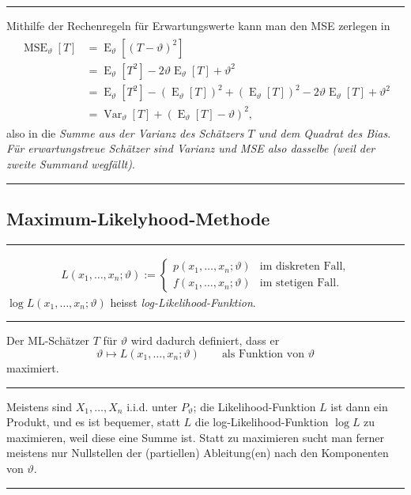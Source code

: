 \documentclass[a4paper, 12pt]{extarticle}
\newcommand{\sep}{\vspace{5pt}\noindent\hrule\vspace{5pt}}
\newcommand{\Var}[2][]{\operatorname{Var}_{#1}\left[ #2 \right]}
\newcommand{\Exp}[2][]{\operatorname{E}_{#1}\left[ #2 \right]}
\newcommand{\MSE}[2][]{\operatorname{MSE}_{#1}\left[ #2 \right]}
\begin{document}
\begin{multicols*}{2}
\sep

\Com Mithilfe der Rechenregeln für Erwartungswerte kann man den MSE zerlegen in
\begin{gather*}
\begin{align*}
\MSE[\vartheta]{T}&=\Exp[\vartheta]{(T-\vartheta)^2}
\\
&=\Exp[\vartheta]{T^2} -2\vartheta\Exp[\vartheta]{T} + \vartheta^2
\\
&=\Exp[\vartheta]{T^2} - (\Exp[\vartheta]{T})^2 + (\Exp[\vartheta]{T})^2 
-2\vartheta\Exp[\vartheta]{T} + \vartheta^2
\\
&=\Var[\vartheta]{T} + (\Exp[\vartheta]{T}-\vartheta)^2,
\end{align*}
\end{gather*}
also in die \emph{Summe aus der Varianz des Schätzers $T$ und dem Quadrat des
Bias}. \emph{Für erwartungstreue Schätzer sind Varianz und MSE also dasselbe
(weil der zweite Summand wegfällt)}.

\sep

\subsection{Maximum-Likelyhood-Methode}
\sep

\begin{gather*}
L(x_1,\ldots,x_n;\vartheta):=\begin{cases}
p(x_1,\ldots,x_n;\vartheta)&\text{im diskreten
Fall},\\
f(x_1,\ldots,x_n;\vartheta)&\text{im stetigen Fall}.
\end{cases}
\end{gather*}
$\log L(x_1,\ldots,x_n;\vartheta)$ heisst
\emph{log-Likelihood-Funktion}.

\sep

 Der ML-Schätzer $T$ für $\vartheta$ wird 
dadurch definiert, dass er
\[
\vartheta \mapsto L(x_1,\ldots,x_n;\vartheta) \qquad
\text{als Funktion von }\vartheta
\]
maximiert.

\sep

Meistens sind $X_1,\ldots,X_n$ i.i.d. unter $P_\vartheta$; die
Likelihood-Funktion $L$ ist dann ein Produkt, und es ist bequemer, statt $L$ die
log-Likelihood-Funktion $\log L$ zu maximieren, weil diese eine Summe ist. Statt
zu maximieren sucht man ferner meistens nur Nullstellen der (partiellen)
Ableitung(en) nach den Komponenten von $\vartheta$.

\sep


\end{multicols*}
\end{document}
